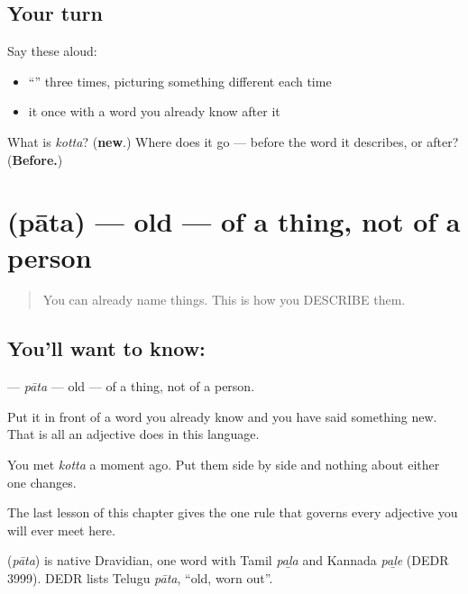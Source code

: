 \subsection*{Your turn}
Say these aloud:

\begin{itemize}
\raggedright
  \item \textquotedblleft{}\textquotedblright{} three times, picturing something different each time
  \item it once with a word you already know after it
\end{itemize}

\begin{tcolorbox}[breakable,colback=teal!4,colframe=teal!35!black,title={Before you move on}]
What is \emph{kotta}? (\textbf{new}.) Where does it go — before the word it describes, or after? (\textbf{Before.})
\end{tcolorbox}
\section[\texorpdfstring{\te{పాత} (pāta)}{పాత (pāta)}]{ (pāta) — old — of a thing, not of a person}

\label{lesson:TE-C42-old}



\begin{quote}
You can already name things. This is how you DESCRIBE them.
\end{quote}

\subsection*{You'll want to know: }
\textbf{} — \emph{pāta} — old — of a thing, not of a person.

Put it in front of a word you already know and you have said something new. That is all an adjective does in this language.

You met \textbf{} \emph{kotta} a moment ago. Put them side by side and nothing about either one changes.

The last lesson of this chapter gives the one rule that governs every adjective you will ever meet here.

\begin{cousinweb}
\textbf{} (\emph{pāta}) is native Dravidian, one word with Tamil \emph{paḻa} and Kannada \emph{paḻe} (DEDR 3999). DEDR lists Telugu \emph{pāta}, \textquotedblleft{}old, worn out\textquotedblright{}.
\end{cousinweb}

